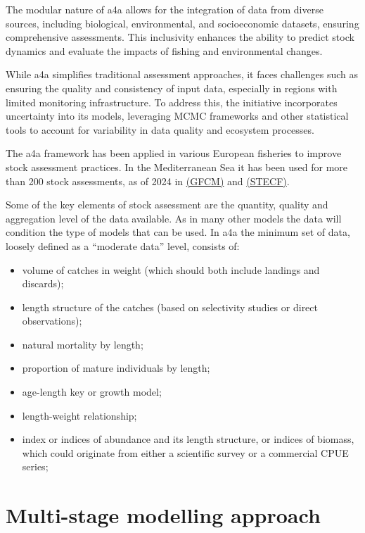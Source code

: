 \documentclass[
]{book}
\providecommand{\tightlist}{%
  \setlength{\itemsep}{0pt}\setlength{\parskip}{0pt}}
\begin{document}
The modular nature of a4a allows for the integration of data from diverse sources, including biological, environmental, and socioeconomic datasets, ensuring comprehensive assessments. This inclusivity enhances the ability to predict stock dynamics and evaluate the impacts of fishing and environmental changes.

While a4a simplifies traditional assessment approaches, it faces challenges such as ensuring the quality and consistency of input data, especially in regions with limited monitoring infrastructure. To address this, the initiative incorporates uncertainty into its models, leveraging MCMC frameworks and other statistical tools to account for variability in data quality and ecosystem processes.

The a4a framework has been applied in various European fisheries to improve stock assessment practices. In the Mediterranean Sea it has been used for more than 200 stock assessments, as of 2024 in \href{https://www.fao.org/gfcm/data/star/en/}{(GFCM)} and \href{https://stecf.ec.europa.eu/data-dissemination/medbs_en}{(STECF)}.

Some of the key elements of stock assessment are the quantity, quality and aggregation level of the data available. As in many other models the data will condition the type of models that can be used. In a4a the minimum set of data, loosely defined as a ``moderate data'' level, consists of:

\begin{itemize}
\tightlist
\item
  volume of catches in weight (which should both include landings and discards);
\item
  length structure of the catches (based on selectivity studies or direct observations);
\item
  natural mortality by length;
\item
  proportion of mature individuals by length;
\item
  age-length key or growth model;
\item
  length-weight relationship;
\item
  index or indices of abundance and its length structure, or indices of biomass, which could originate from either a scientific survey or a commercial CPUE series;
\end{itemize}

\hypertarget{multi-stage-modelling-approach}{%
\section{Multi-stage modelling approach}\label{multi-stage-modelling-approach}}
\end{document}
